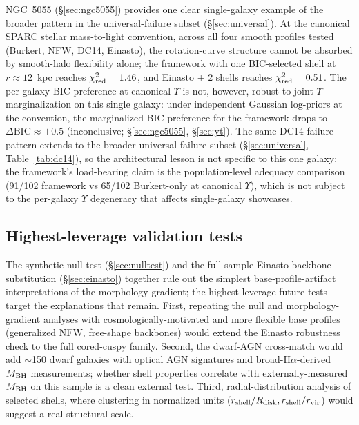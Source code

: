 \documentclass[linenumbers]{aastex701}
\newcommand{\Yt}{\Upsilon}
\newcommand{\chired}{\chi^2_{\rm red}}
\begin{document}
NGC~5055 (\S\ref{sec:ngc5055}) provides one clear single-galaxy example of the broader pattern in the universal-failure subset (\S\ref{sec:universal}). At the canonical SPARC stellar mass-to-light convention, across all four smooth profiles tested (Burkert, NFW, DC14, Einasto), the rotation-curve structure cannot be absorbed by smooth-halo flexibility alone; the framework with one BIC-selected shell at $r \approx 12$~kpc reaches $\chired = 1.46$, and Einasto $+$ 2 shells reaches $\chired = 0.51$. The per-galaxy BIC preference at canonical $\Yt$ is not, however, robust to joint $\Yt$ marginalization on this single galaxy: under independent Gaussian log-priors at the \citet{Li2020} convention, the marginalized BIC preference for the framework drops to $\Delta\mathrm{BIC} \approx +0.5$ (inconclusive; \S\ref{sec:ngc5055}, \S\ref{sec:yt}). The same DC14 failure pattern extends to the broader universal-failure subset (\S\ref{sec:universal}, Table~\ref{tab:dc14}), so the architectural lesson is not specific to this one galaxy; the framework's load-bearing claim is the population-level adequacy comparison (91/102 framework vs 65/102 Burkert-only at canonical $\Yt$), which is not subject to the per-galaxy $\Yt$ degeneracy that affects single-galaxy showcases.

\subsection{Highest-leverage validation tests}\label{sec:future}

The synthetic null test (\S\ref{sec:nulltest}) and the full-sample Einasto-backbone substitution (\S\ref{sec:einasto}) together rule out the simplest base-profile-artifact interpretations of the morphology gradient; the highest-leverage future tests target the explanations that remain. First, repeating the null and morphology-gradient analyses with cosmologically-motivated and more flexible base profiles (generalized NFW, free-shape backbones) would extend the Einasto robustness check to the full cored-cuspy family. Second, the \citet{Reines2013} dwarf-AGN cross-match would add $\sim$150 dwarf galaxies with optical AGN signatures and broad-H$\alpha$-derived $M_{\rm BH}$ measurements; whether shell properties correlate with externally-measured $M_{\rm BH}$ on this sample is a clean external test. Third, radial-distribution analysis of selected shells, where clustering in normalized units ($r_{\rm shell}/R_{\rm disk}, r_{\rm shell}/r_{\rm vir}$) would suggest a real structural scale.
\end{document}
